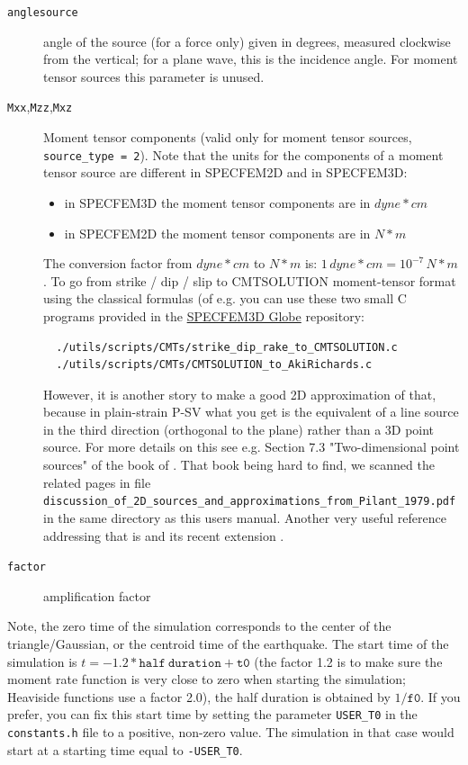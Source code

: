 \begin{description}
\item[{\texttt{anglesource}}] angle of the source (for a force only) given in degrees, measured clockwise from the vertical;
for a plane wave, this is the incidence angle. For moment tensor sources this parameter is unused.

\item[{\texttt{Mxx}},{\texttt{Mzz}},{\texttt{Mxz}}] Moment tensor components (valid only for moment tensor sources, \texttt{source\_type = 2}).
Note that the units for the components of a moment tensor source are different in SPECFEM2D and in SPECFEM3D:
%
\begin{itemize}
\item in SPECFEM3D the moment tensor components are in $dyne*cm$
\item in SPECFEM2D the moment tensor components are in $N*m$
\end{itemize}
%
The conversion factor from $dyne*cm$ to $N*m$ is: $1 \, dyne*cm = 10^{-7} \, N*m$.
To go from strike / dip / slip to CMTSOLUTION moment-tensor format using the classical formulas (of e.g. \cite{AkRi80} you can use these two small C programs provided in the \href{https://github.com/SPECFEM/specfem3d_globe}{SPECFEM3D Globe} repository:
{\small
\begin{verbatim}
  ./utils/scripts/CMTs/strike_dip_rake_to_CMTSOLUTION.c
  ./utils/scripts/CMTs/CMTSOLUTION_to_AkiRichards.c
\end{verbatim}
}
However, it is another story to make a good 2D approximation of that, because in plain-strain P-SV what you get is the equivalent of a line source in the third direction (orthogonal to the plane) rather than a 3D point source.
For more details on this see e.g. Section 7.3 "Two-dimensional point sources" of the book of \cite{Pil79}. That book being hard to find, we scanned the related pages in file\newline
\texttt{discussion\_of\_2D\_sources\_and\_approximations\_from\_Pilant\_1979.pdf} in the same directory as this users manual.
Another very useful reference addressing that is \cite{HeVi88} and its recent extension \citep{LiHeClSu14}.

\item[{\texttt{factor}}] amplification factor

\end{description}

Note, the zero time of the simulation corresponds to the center of the triangle/Gaussian,
or the centroid time of the earthquake. The start time of the simulation
is $t=-1.2*\mathtt{half~duration} + \mathtt{t0}$ (the factor 1.2 is to make sure the moment
rate function is very close to zero when starting the simulation; Heaviside functions use a factor 2.0),
the half duration is obtained by $1/\mathtt{f0}$.
If you prefer, you can fix this start time by setting the parameter \texttt{USER\_T0} in the \texttt{constants.h} file
to a positive, non-zero value. The simulation in that case would start at a starting time equal to \texttt{-USER\_T0}.


